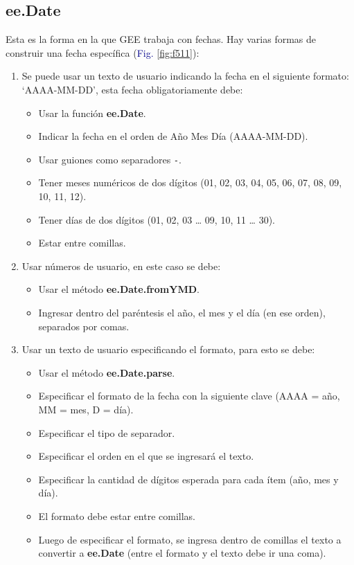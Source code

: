 \documentclass[
  12pt,
  letterpaper,
  twoside]{book}
\providecommand{\tightlist}{%
  \setlength{\itemsep}{0pt}\setlength{\parskip}{0pt}}
\newcommand\boldpurple[1]{\textcolor{darkpurple}{\textbf{#1}}}
\begin{document}
\hypertarget{ee.date}{%
\subsection*{ee.Date}\label{ee.date}}

Esta es la forma en la que GEE trabaja con fechas. Hay varias formas de construir una fecha específica (\textcolor{darkblue}{Fig.} \ref{fig:f511}):

\begin{enumerate}
\def\labelenumi{\arabic{enumi}.}
\tightlist
\item
  Se puede usar un texto de usuario indicando la fecha en el siguiente formato: `AAAA-MM-DD', esta fecha obligatoriamente debe:

  \begin{itemize}
  \tightlist
  \item
    Usar la función \boldpurple{ee.Date}.
  \item
    Indicar la fecha en el orden de Año Mes Día (AAAA-MM-DD).
  \item
    Usar guiones como separadores \texttt{-}.
  \item
    Tener meses numéricos de dos dígitos (01, 02, 03, 04, 05, 06, 07, 08, 09, 10, 11, 12).
  \item
    Tener días de dos dígitos (01, 02, 03 \ldots{} 09, 10, 11 \ldots{} 30).
  \item
    Estar entre comillas.
  \end{itemize}
\item
  Usar números de usuario, en este caso se debe:

  \begin{itemize}
  \tightlist
  \item
    Usar el método \boldpurple{ee.Date.fromYMD}.
  \item
    Ingresar dentro del paréntesis el año, el mes y el día (en ese orden), separados por comas.
  \end{itemize}
\item
  Usar un texto de usuario especificando el formato, para esto se debe:

  \begin{itemize}
  \tightlist
  \item
    Usar el método \boldpurple{ee.Date.parse}.
  \item
    Especificar el formato de la fecha con la siguiente clave (AAAA = año, MM = mes, D = día).
  \item
    Especificar el tipo de separador.
  \item
    Especificar el orden en el que se ingresará el texto.
  \item
    Especificar la cantidad de dígitos esperada para cada ítem (año, mes y día).
  \item
    El formato debe estar entre comillas.
  \item
    Luego de especificar el formato, se ingresa dentro de comillas el texto a convertir a \boldpurple{ee.Date} (entre el formato y el texto debe ir una coma).
  \end{itemize}
\end{enumerate}
\end{document}

